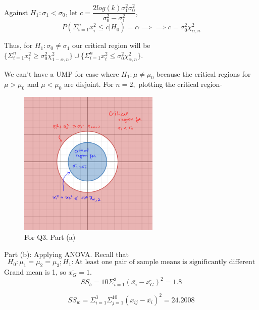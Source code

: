\documentclass[12pt, oneside]{article}
\begin{document}
\begin{enumerate}
Against $H_1: \sigma_1 < \sigma_0$, let $c = \dfrac{2log(k)\sigma_1^2\sigma_0^2}{\sigma_0^2 - \sigma_1^2}$,
$$
P(\Sigma_{i=1}^{n} x_i^2 \le c | H_0) = \alpha \implies \implies c = \sigma_0^2 \chi_{\alpha,n}^2
$$

Thus, for $H_1: \sigma_0 \neq \sigma_1$ our critical region will be $\{ 
\Sigma_{i=1}^{n} x_i^2 \ge \sigma_0^2 \chi_{1-\alpha,n}^2 \} \cup \{ 
\Sigma_{i=1}^{n} x_i^2 \le \sigma_0^2 \chi_{\alpha,n}^2\}$. 


We can't have a UMP for case where $H_1 : \mu \neq \mu_0$ because the critical regions for $\mu > \mu_0$ and $\mu < \mu_0$ are disjoint. For $n=2,$ plotting the critical region-


\begin{figure}[!ht]
    \centering
    \includegraphics[width=0.6\textwidth]{390_asst_q3parta_2.PNG}
    \caption{\label{fig:q3} For Q3. Part (a)}
\end{figure}


Part (b): Applying ANOVA. 
\newline Recall that 
$$
H_0 : \mu_1 = \mu_2 = \mu_3; H_1 : \text{At least one pair of sample means is significantly different}
$$
\newline Grand mean is 1, so $\bar{x_G} = 1$. 
$$SS_b = 10 \Sigma_{i=1}^{3} (\bar{x_i} - \bar{x_G})^2 = 1.8$$

$$SS_w = \Sigma_{i=1}^{3} \Sigma_{j=1}^{10} (x_{ij} - \bar{x_i})^2 = 24.2008$$


\end{enumerate}
\end{document}
